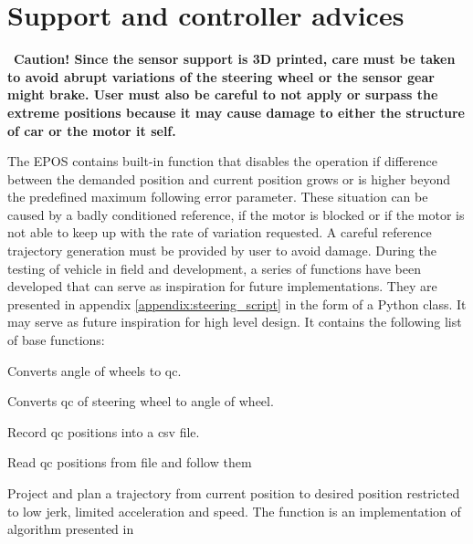 \section{Support and controller advices}
\begin{mdframed}[backgroundcolor=red!20, roundcorner=10pt, innertopmargin=5pt, innerbottommargin=5pt, skipabove=0pt]
	 \Warning \, \textbf{Caution! Since the sensor support is 3D printed, care must be taken to avoid abrupt variations of the steering wheel or the sensor gear might brake. User must also be careful to not apply or surpass the extreme positions because it may cause damage to either the structure of car or the motor it self.}
\end{mdframed}


The \gls{EPOS} contains built-in function that disables the operation if difference between the demanded position and current position grows or is higher beyond the predefined maximum following error parameter. These situation can be caused by a badly conditioned reference, if the motor is blocked or if the motor is not able to keep up with the rate of variation requested. A careful reference trajectory generation must be provided by user to avoid damage. During the testing of vehicle in field and development, a series of functions have been developed that can serve as inspiration for future implementations. They are presented in appendix \ref{appendix:steering_script} in the form of a Python class. It may serve as future inspiration for high level design. It contains the following list of base functions:
\begin{description}[align=left, labelwidth=10em, leftmargin=5em, style=nextline]
    \item [getQcPosition] Converts angle of wheels to qc.
    \item[getDeltaAngle] Converts qc of steering wheel to angle of wheel.
    \item[saveToFile] Record qc positions into a csv file.
    \item[readFromFile] Read qc positions from file and follow them
    \item[moveToPosition] Project and plan a trajectory from current position to desired position restricted to low jerk, limited acceleration and speed. The function is an implementation of algorithm presented in \cite{Li2007} 
\end{description}

 